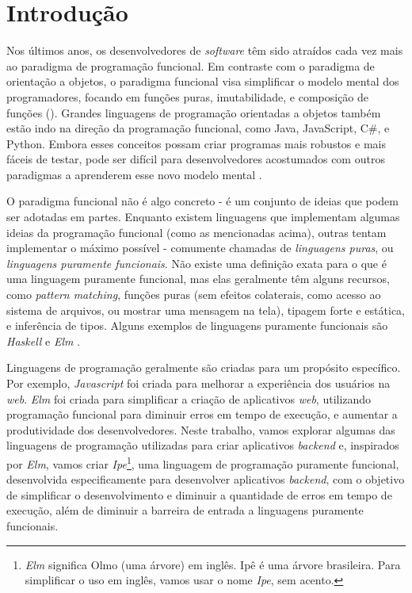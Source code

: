 
\chapter{Introdução}

Nos últimos anos, os desenvolvedores de \textit{software} têm sido atraídos cada vez mais
ao paradigma de programação funcional. Em contraste com o paradigma de orientação
a objetos, o paradigma funcional visa simplificar o modelo mental dos programadores,
focando em funções puras, imutabilidade, e composição de funções (\textcite{functionalprogramming-future}).
Grandes linguagens de programação orientadas a objetos também estão indo na direção
da programação funcional, como Java, JavaScript, C\#, e Python. Embora esses
conceitos possam criar programas mais robustos e mais fáceis de testar, pode ser
difícil para desenvolvedores acostumados com outros paradigmas a aprenderem esse
novo modelo mental \cite{promisesoffp}.

O paradigma funcional não é algo concreto - é um conjunto de ideias que podem ser
adotadas em partes. Enquanto existem linguagens que implementam
algumas ideias da programação funcional (como as mencionadas acima), outras
tentam implementar o máximo possível - comumente chamadas de \textit{linguagens puras},
ou \textit{linguagens puramente funcionais}. Não existe uma definição exata para
o que é uma linguagem puramente funcional, mas elas geralmente têm alguns recursos,
como \textit{pattern matching}, funções puras (sem efeitos colaterais, como acesso
ao sistema de arquivos, ou mostrar uma mensagem na tela), tipagem forte e estática,
e inferência de tipos. Alguns exemplos de linguagens puramente funcionais são
\textit{Haskell} \cite{conceptionoffunctionalpl} e \textit{Elm} \cite{czaplicki2012elm}.

Linguagens de programação geralmente são criadas para um propósito específico. Por
exemplo, \textit{Javascript} foi criada para melhorar a experiência dos usuários
na \textit{web}. \textit{Elm} foi criada para simplificar a criação de aplicativos
\textit{web}, utilizando programação funcional para diminuir erros em tempo de
execução, e aumentar a produtividade dos desenvolvedores. Neste trabalho, vamos
explorar algumas das linguagens de programação utilizadas para criar aplicativos
\textit{backend} e, inspirados por \textit{Elm}, vamos criar
\textit{Ipe}\footnote{\textit{Elm} significa Olmo (uma árvore) em inglês. Ipê é uma árvore brasileira. Para simplificar o uso em inglês, vamos usar o nome \textit{Ipe}, sem acento.},
uma linguagem de programação puramente funcional, desenvolvida especificamente para
desenvolver aplicativos \textit{backend}, com o objetivo de simplificar o desenvolvimento
e diminuir a quantidade de erros em tempo de execução, além de diminuir a barreira
de entrada a linguagens puramente funcionais.

